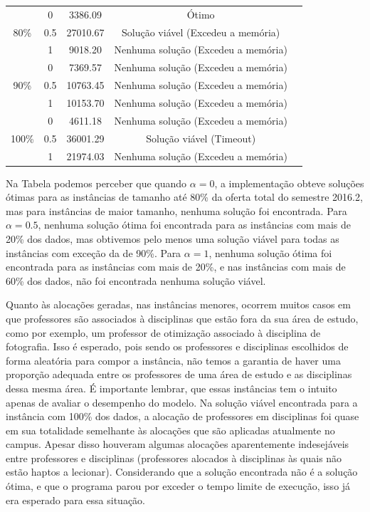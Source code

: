 \begin{table}[h!]
{\begin{tabular}{ccccc}
			\midrule
			\multirow{3}{*}{80\%} &   0 &  3386.09 & Ótimo \\
			                      & 0.5 & 27010.67 & Solução viável (Excedeu a memória)\\
			                      &   1 &  9018.20 & Nenhuma solução (Excedeu a memória)\\
			\midrule
			\multirow{3}{*}{90\%} &   0 &  7369.57 & Nenhuma solução (Excedeu a memória)\\
			                      & 0.5 & 10763.45 & Nenhuma solução (Excedeu a memória)\\
			                      &   1 & 10153.70 & Nenhuma solução (Excedeu a memória)\\
			\midrule
			\multirow{3}{*}{100\%}&   0 &  4611.18 & Nenhuma solução (Excedeu a memória)\\
			                      & 0.5 & 36001.29 & Solução viável (Timeout) \\
			                      &   1 & 21974.03 & Nenhuma solução (Excedeu a memória)\\
			\bottomrule
		\end{tabular}%
	}{
	}
\end{table}

\newpage

Na Tabela  podemos perceber que quando $\alpha = 0$, a implementação obteve soluções ótimas para as instâncias de tamanho até 80\% da oferta total do semestre 2016.2, mas para instâncias de maior tamanho, nenhuma solução foi encontrada. Para $\alpha = 0.5$, nenhuma solução ótima foi encontrada para as instâncias com mais de 20\% dos dados, mas obtivemos pelo menos uma solução viável para todas as instâncias com exceção da de 90\%. Para $\alpha = 1$, nenhuma solução ótima foi encontrada para as instâncias com mais de 20\%, e nas instâncias com mais de 60\% dos dados, não foi encontrada nenhuma solução viável.

Quanto às alocações geradas, nas instâncias menores, ocorrem muitos casos em que professores são associados à disciplinas que estão fora da sua área de estudo, como por exemplo, um professor de otimização associado à disciplina de fotografia. Isso é esperado, pois sendo os professores e disciplinas escolhidos de forma aleatória para compor a instância, não temos a garantia de haver uma proporção adequada entre os professores de uma área de estudo e as disciplinas dessa mesma área. É importante lembrar, que essas instâncias tem o intuito apenas de avaliar o desempenho do modelo. Na solução viável encontrada para a instância com 100\% dos dados, a alocação de professores em disciplinas foi quase em sua totalidade semelhante às alocações que são aplicadas atualmente no campus. Apesar disso houveram algumas alocações aparentemente indesejáveis entre professores e disciplinas (professores alocados à disciplinas às quais não estão haptos a lecionar). Considerando que a solução encontrada não é a solução ótima, e que o programa parou por exceder o tempo limite de execução, isso já era esperado para essa situação.

